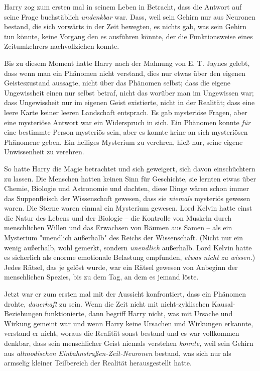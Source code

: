 {Harry zog zum ersten mal in seinem Leben in Betracht, dass die Antwort auf seine Frage buchstäblich \emph{undenkbar} war. Dass, weil sein Gehirn nur aus Neuronen bestand, die sich vorwärts in der Zeit bewegten, es nichts gab, was sein Gehirn tun könnte, keine Vorgang den es ausführen könnte, der die Funktionsweise eines Zeitumkehrers nachvollziehen konnte.

Bis zu diesem Moment hatte Harry nach der Mahnung von E. T. Jaynes gelebt, dass wenn man ein Phänomen nicht verstand, dies nur etwas über den eigenen Geisteszustand aussagte, nicht über das Phänomen selbst; dass die eigene Ungewissheit einen nur selbst betraf, nicht das worüber man im Ungewissen war; dass Ungewissheit nur im eigenen Geist existierte, nicht in der Realität; dass eine leere Karte keiner leeren Landschaft entsprach. Es gab mysteriöse Fragen, aber eine mysteriöse Antwort war ein Widerspruch in sich. Ein Phänomen konnte \emph{für} eine bestimmte Person mysteriös sein, aber es konnte keine an sich mysteriösen Phänomene geben. Ein heiliges Mysterium zu verehren, hieß nur, seine eigene Unwissenheit zu verehren.

So hatte Harry die Magie betrachtet und sich geweigert, sich davon einschüchtern zu lassen. Die Menschen hatten keinen Sinn für Geschichte, sie lernten etwas über Chemie, Biologie und Astronomie und dachten, diese Dinge wären schon immer das Suppenfleisch der Wissenschaft gewesen, dass sie \emph{niemals} mysteriös gewesen waren. Die Sterne waren einmal ein Mysterium gewesen. Lord Kelvin hatte einst die Natur des Lebens und der Biologie -- die Kontrolle von Muskeln durch menschlichen Willen und das Erwachsen von Bäumen aus Samen -- als ein Mysterium "unendlich außerhalb" des Reichs der Wissenschaft. (Nicht nur ein wenig außerhalb, wohl gemerkt, sondern \emph{unendlich} außerhalb. Lord Kelvin hatte es sicherlich als enorme emotionale Belastung empfunden, \emph{etwas nicht zu wissen.}) Jedes Rätsel, das je gelöst wurde, war ein Rätsel gewesen von Anbeginn der menschlichen Spezies, bis zu dem Tag, an dem es jemand löste.

Jetzt war er zum ersten mal mit der Aussicht konfrontiert, dass ein Phänomen drohte, \emph{dauerhaft} zu sein. Wenn die Zeit nicht mit nicht-zyklischen Kausal-Beziehungen funktionierte, dann begriff Harry nicht, was mit Ursache und Wirkung gemeint war und wenn Harry keine Ursachen und Wirkungen erkannte, verstand er nicht, woraus die Realität sonst bestand und es war vollkommen denkbar, dass sein menschlicher Geist niemals verstehen \emph{konnte,} weil sein Gehirn aus \emph{altmodischen Einbahnstraßen-Zeit-Neuronen} bestand, was sich nur als armselig kleiner Teilbereich der Realität herausgestellt hatte.

}

